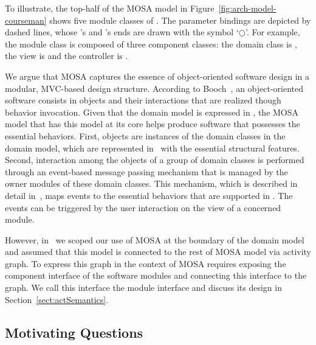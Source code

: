 %
To illustrate, the top-half of the MOSA model in Figure~\ref{fig:arch-model-courseman} shows five module classes of \courseman. The parameter bindings are depicted by dashed lines, whose 's and 's ends are drawn with the symbol `$\bigcirc$'. 
%
For example, the module class  is composed of three component classes: the domain class is , the view is  and the controller is .

We argue that MOSA captures the essence of object-oriented software design in a modular, MVC-based design structure. According to Booch~\cite{booch_object-oriented_1986}, an object-oriented software consists in objects and their interactions that are realized though behavior invocation. Given that the domain model is expressed in \dcsl, the MOSA model that has this model at its core helps produce software that possesses the essential behaviors. First, objects are instances of the domain classes in the domain model, which are represented in \dcsl~with the essential structural features. Second, interaction among the objects of a group of domain classes is performed through an event-based message passing mechanism that is managed by the owner modules of these domain classes. This mechanism, which is described in detail in~\cite{le_jdomainapp_2017}, maps events to the essential behaviors that are supported in \dcsl. The events can be triggered by the user interaction on the view of a concerned module. 

However, in~\cite{le_domain_2018} we scoped our use of MOSA at the boundary of the domain model and assumed that this model is connected to the rest of MOSA model via activity graph. To express this graph in the context of MOSA requires exposing the component interface of the software modules and connecting this interface to the graph. We call this interface the module interface and discuss its design in Section~\ref{sect:actSemantics}. 

\subsection{Motivating Questions}


